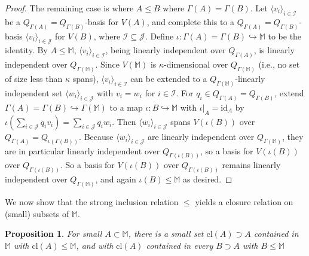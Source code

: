 \documentclass{amsart}
\newtheorem{prop}[theorem]{Proposition}
\theoremstyle{definition}
\theoremstyle{remark}
\numberwithin{equation}{section}
\begin{document}
\begin{proof}
    The remaining case is where $A \leq B$ where $\Gamma(A) = \Gamma(B)$. Let $\langle v_{i} \rangle_{i \in \mathcal{I}}$ be a $Q_{\Gamma(A)}=Q_{\Gamma(B)}$-basis for $V(A)$, and complete this to a $Q_{\Gamma(A)}=Q_{\Gamma(B)}$-basis $\langle v_{i} \rangle_{i \in \mathcal{J}}$ for $V(B)$, where $\mathcal{I} \subseteq \mathcal{J}$. Define $\iota: \Gamma(A)=\Gamma(B) \hookrightarrow \mathbb{M}$ to be the identity. By $A\leq \mathbb{M}$, $\langle v_{i} \rangle_{i \in \mathcal{I}}$, being linearly independent over $Q_{\Gamma(A)}$, is linearly independent over $Q_{\Gamma(\mathbb{M})}$. Since $V(\mathbb{M})$ is $\kappa$-dimensional over $Q_{\Gamma(\mathbb{M})}$ (i.e., no set of size less than $\kappa$ spans), $\langle v_{i} \rangle_{i \in \mathcal{I}}$ can be extended to a $Q_{\Gamma(\mathbb{M})}$-linearly independent set $\langle w_{i} \rangle_{i \in \mathcal{J}}$ with $v_{i} = w_{i}$ for $i \in \mathcal{I}$. For $q_{i} \in Q_{\Gamma(A)}=Q_{\Gamma(B)}$, extend $\Gamma(A)=\Gamma(B)\hookrightarrow \Gamma(\mathbb{M})$ to a map  $\iota: B \hookrightarrow \mathbb{M}$ with $\iota|_{A}=\mathrm{id}_{A}$ by $\iota(\sum_{i \in \mathcal{J}} q_{i}v_{i})=\sum_{i \in \mathcal{J}} q_{i}w_{i}$. Then $\langle w_{i} \rangle_{i \in \mathcal{J}}$ spans $V(\iota(B))$ over $Q_{\Gamma(A)}=Q_{\iota(\Gamma(B))}$. Because  $\langle w_{i} \rangle_{i \in \mathcal{J}}$ are linearly independent over $Q_{\Gamma(\mathbb{M})}$, they are in particular linearly independent over $Q_{\Gamma(\iota(B))}$, so a basis for $V(\iota(B))$ over $Q_{\Gamma(\iota(B))}$. So a basis for $V(\iota(B))$ over $Q_{\Gamma(\iota(B))}$ remains linearly independent over $Q_{\Gamma(\mathbb{M})}$, and again $\iota(B) \leq \mathbb{M}$ as desired.
\end{proof}

We now show that the strong inclusion relation $\leq $ yields a closure relation on (small) subsets of $\mathbb{M}$.

\begin{prop}\label{closure with respect to strong inclusion}
    For small $A \subset \mathbb{M}$, there is a small set $\mathrm{cl}(A) \supset A$ contained in $\mathbb{M}$ with $\mathrm{cl}(A) \leq \mathbb{M}$, and with $\mathrm{cl}(A)$ contained in every $B \supset A$ with $B \leq \mathbb{M}$
\end{prop}
\end{document}
